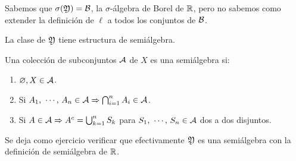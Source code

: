 Sabemos que \(\sigma(\mathfrak{Y}) = \mathcal{B}\), la \(\sigma\)-álgebra de Borel de \(\mathbb{R}\), pero no sabemos como extender la definición de \(\ell\) a todos los conjuntos de \(\mathcal{B}\).

La clase de \(\mathfrak{Y}\) tiene estructura de semiálgebra.

\begin{definition}[Semiálgebra]
    Una colección de subconjuntos \(\mathcal{A}\) de \(X\) es una semiálgebra si: \begin{enumerate}
        \item \(\varnothing, X \in \mathcal{A}\).
        \item Si \(A_1 \text{, } \cdots \text{, } A_n \in \mathcal{A} \Rightarrow \bigcap_{i = 1}^n A_i \in \mathcal{A}\).
        \item Si \(A \in \mathcal{A} \Rightarrow A^c = \bigcup_{k = 1}^n S_k\) para \(S_1\text{, } \cdots \text{, } S_n \in \mathcal{A}\) dos a dos disjuntos.
    \end{enumerate}
\end{definition}

Se deja como ejercicio verificar que efectivamente \(\mathfrak{Y}\) es una semiálgebra con la definición de semiálgebra de \(\mathbb{R}\).

